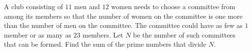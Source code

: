 A club consisting of $11$ men and $12$ women needs to choose a committee from among its members so that the number of women on the committee is one more than the number of men on the committee. The committee could have as few as $1$ member or as many as $23$ members. Let $N$ be the number of such committees that can be formed. Find the sum of the prime numbers that divide $N$.